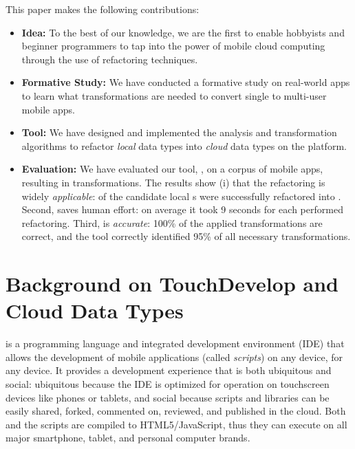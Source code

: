 \documentclass[preprint]{sigplanconf}
\begin{document}
This paper makes the following contributions:
\begin{itemize}
\item{\textbf{Idea:}} To the best of our knowledge, we are the first to enable hobbyists and beginner programmers to tap into the power of mobile cloud
computing through the use of refactoring techniques.

\item{\textbf{Formative Study:}} We have conducted a formative study on \numFormative real-world apps to learn what transformations are needed to convert single to multi-user mobile apps. 

\item{\textbf{Tool:}} We have designed and implemented the analysis and transformation algorithms to refactor \emph{local} data types into \emph{cloud} data types on the \TD platform. 

\item{\textbf{Evaluation:}} We have evaluated our tool, \tool, on a corpus of \numScripts mobile apps, resulting in \numTransformations transformations. The results show (i) that the refactoring is widely \emph{applicable}: \percentRefactored of the candidate local s were successfully refactored into . Second, \tool saves human effort: on average it took 9 seconds for each performed refactoring. Third, \tool is  
\emph{accurate}: 100\% of the applied transformations are correct, and the tool correctly identified 95\% of all necessary transformations.  
\end{itemize}


\section{Background on TouchDevelop and Cloud Data Types}

\TD is a programming language and integrated development environment (IDE) that
allows the development of mobile applications (called \emph{scripts}) on any
device, for any device. 
It provides a development experience that is both ubiquitous and social:
ubiquitous because the IDE is optimized for operation on touchscreen devices
like phones or tablets, and social because scripts and libraries can be easily
shared, forked, commented on, reviewed, and published in the cloud.
Both \TD and the \TD scripts are compiled to HTML5/JavaScript, thus they can
execute on all major smartphone, tablet, and personal computer brands.  
\end{document}
